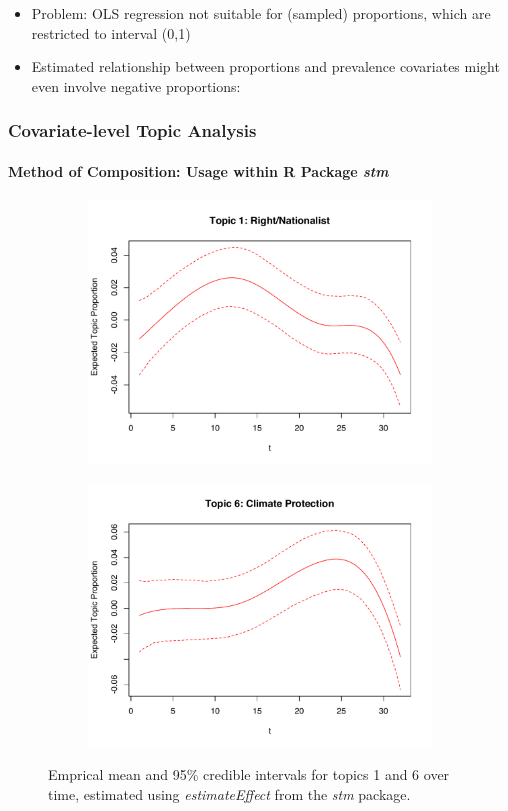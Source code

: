 \documentclass[xcolor=dvipsnames]{beamer}
\begin{document}
\begin{frame}
\begin{itemize}
\item Problem: OLS regression not suitable for (sampled) proportions, which are restricted to interval (0,1)
\item Estimated relationship between proportions and prevalence covariates might even involve negative proportions:
\end{itemize}
\frametitle{Covariate-level Topic Analysis}
\framesubtitle{Method of Composition: Usage within R Package \textit{stm}}
  \begin{figure}[h!]
  \centering
  \captionsetup{justification=centering,margin=2cm}
  \begin{subfigure}[b]{0.4\linewidth}
    \includegraphics[width=\linewidth]{../../plots/presentation/estEffect_topic1.pdf}
  \end{subfigure}
  \begin{subfigure}[b]{0.4\linewidth}
    \includegraphics[width=\linewidth]{../../plots/presentation/estEffect_topic6.pdf}
  \end{subfigure}
  \caption{Emprical mean and 95\% credible intervals for topics 1 and 6 over time, estimated using \textit{estimateEffect} from the \textit{stm} package.}
  \label{fig:estEffect_topic16}
\end{figure}
\end{frame}
\end{document}
